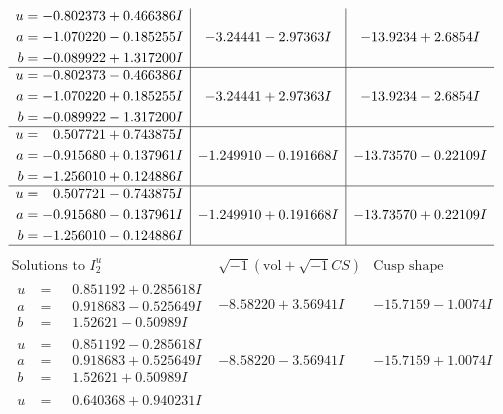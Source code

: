 \documentclass[1p]{elsarticle_modified}
\theoremstyle{definition}
\newcommand{\I}{\sqrt{-1}}
\begin{document}
$$\begin{array}{c|c|c}
\begin{aligned}
u &= -0.802373 + 0.466386 I \\
a &= -1.070220 - 0.185255 I \\
b &= -0.089922 + 1.317200 I\end{aligned}
 & -3.24441 - 2.97363 I & -13.9234 + 2.6854 I \\ \hline\begin{aligned}
u &= -0.802373 - 0.466386 I \\
a &= -1.070220 + 0.185255 I \\
b &= -0.089922 - 1.317200 I\end{aligned}
 & -3.24441 + 2.97363 I & -13.9234 - 2.6854 I \\ \hline\begin{aligned}
u &= \phantom{-}0.507721 + 0.743875 I \\
a &= -0.915680 + 0.137961 I \\
b &= -1.256010 + 0.124886 I\end{aligned}
 & -1.249910 - 0.191668 I & -13.73570 - 0.22109 I \\ \hline\begin{aligned}
u &= \phantom{-}0.507721 - 0.743875 I \\
a &= -0.915680 - 0.137961 I \\
b &= -1.256010 - 0.124886 I\end{aligned}
 & -1.249910 + 0.191668 I & -13.73570 + 0.22109 I\\
 \hline 
 \end{array}$$\newpage$$\begin{array}{c|c|c}  
\text{Solutions to }I^u_{2}& \I (\text{vol} + \sqrt{-1}CS) & \text{Cusp shape}\\
 \hline 
\begin{aligned}
u &= \phantom{-}0.851192 + 0.285618 I \\
a &= \phantom{-}0.918683 - 0.525649 I \\
b &= \phantom{-}1.52621 - 0.50989 I\end{aligned}
 & -8.58220 + 3.56941 I & -15.7159 - 1.0074 I \\ \hline\begin{aligned}
u &= \phantom{-}0.851192 - 0.285618 I \\
a &= \phantom{-}0.918683 + 0.525649 I \\
b &= \phantom{-}1.52621 + 0.50989 I\end{aligned}
 & -8.58220 - 3.56941 I & -15.7159 + 1.0074 I \\ \hline\begin{aligned}
u &= \phantom{-}0.640368 + 0.940231 I \\

\end{aligned}
\end{array}$$
\end{document}

